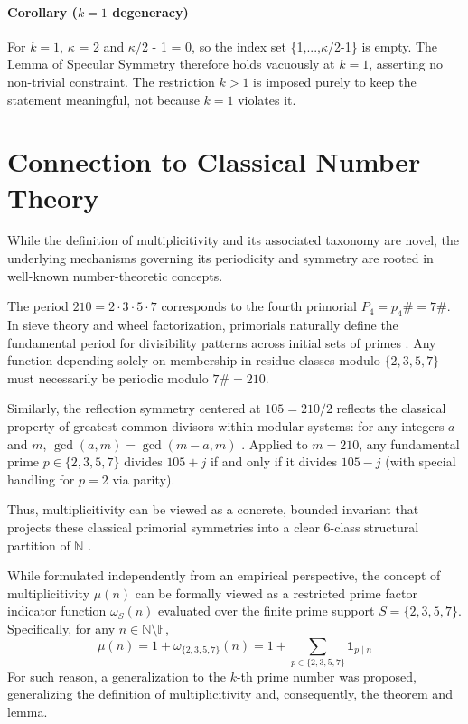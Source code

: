 \documentclass{article}
\begin{document}
\paragraph{Corollary ($k=1$ degeneracy)} For $k=1$, $\kappa$ = 2 and $\kappa$/2 - 1 = 0, so the index set \{1,...,$\kappa$/2-1\} is empty. The Lemma of Specular Symmetry therefore holds vacuously at $k=1$, asserting no non-trivial constraint. The restriction $k>1$ is imposed purely to keep the statement meaningful, not because $k=1$ violates it.


\section{Connection to Classical Number Theory}
While the definition of multiplicitivity and its associated taxonomy are novel, the underlying mechanisms governing its periodicity and symmetry are rooted in well-known number-theoretic concepts.

The period $210 = 2 \cdot 3 \cdot 5 \cdot 7$ corresponds to the fourth primorial $P_4 = p_4\# = 7\#$. In sieve theory and wheel factorization, primorials naturally define the fundamental period for divisibility patterns across initial sets of primes \cite{halberstam1974}. Any function depending solely on membership in residue classes modulo $\{2, 3, 5, 7\}$ must necessarily be periodic modulo $7\# = 210$.

Similarly, the reflection symmetry centered at $105 = 210/2$ reflects the classical property of greatest common divisors within modular systems: for any integers $a$ and $m$, $\gcd(a, m) = \gcd(m - a, m)$ \cite{hardy2008}. Applied to $m = 210$, any fundamental prime $p \in \{2, 3, 5, 7\}$ divides $105 + j$ if and only if it divides $105 - j$ (with special handling for $p=2$ via parity). 

Thus, multiplicitivity can be viewed as a concrete, bounded invariant that projects these classical primorial symmetries into a clear 6-class structural partition of $\mathbb{N}$ \cite{apostol1976}.

While formulated independently from an empirical perspective, the concept of multiplicitivity $\mu(n)$ can be formally viewed as a restricted prime factor indicator function $\omega_S(n)$ \cite{hardyramanujan1917} evaluated over the finite prime support $S = \{2, 3, 5, 7\}$. Specifically, for any $n \in \mathbb{N} \setminus \mathbb{F}$,$$\mu(n) = 1+\omega_{\{2,3,5,7\}}(n) = 1+\sum_{p \in \{2,3,5,7\}} \mathbf{1}_{p \mid n}$$
For such reason, a generalization to the $k$-th prime number was proposed, generalizing the definition of multiplicitivity and, consequently, the theorem and lemma.
\end{document}
